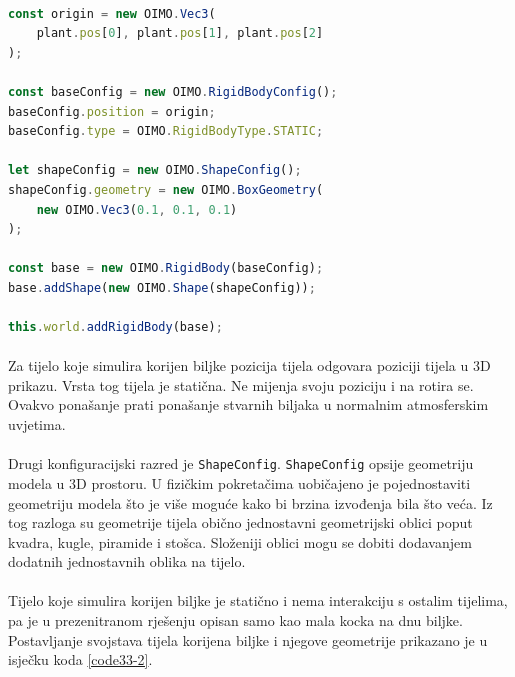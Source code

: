 \documentclass[times, utf8, diplomski]{fer}
\begin{document}
\paragraph{}

\begin{lstlisting}[language=Javascript, caption=Postavljanje tijela korijena biljke i njegovih svojstava,label=code33-2]
const origin = new OIMO.Vec3(
	plant.pos[0], plant.pos[1], plant.pos[2]
);

const baseConfig = new OIMO.RigidBodyConfig();
baseConfig.position = origin;
baseConfig.type = OIMO.RigidBodyType.STATIC;

let shapeConfig = new OIMO.ShapeConfig();
shapeConfig.geometry = new OIMO.BoxGeometry(
	new OIMO.Vec3(0.1, 0.1, 0.1)
);

const base = new OIMO.RigidBody(baseConfig);
base.addShape(new OIMO.Shape(shapeConfig));

this.world.addRigidBody(base);
\end{lstlisting}

\paragraph{}
Za tijelo koje simulira korijen biljke pozicija tijela odgovara poziciji tijela u 3D 
prikazu. Vrsta tog tijela je statična. Ne mijenja svoju poziciju i na rotira se. Ovakvo
ponašanje prati ponašanje stvarnih biljaka u normalnim atmosferskim uvjetima.

\paragraph{}
Drugi konfiguracijski razred je \verb#ShapeConfig#. \verb#ShapeConfig# opsije geometriju 
modela u 3D prostoru. U fizičkim pokretačima uobičajeno je pojednostaviti geometriju modela
što je više moguće kako bi brzina izvođenja bila što veća. Iz tog razloga su geometrije 
tijela obično jednostavni geometrijski oblici poput kvadra, kugle, piramide i stošca.
Složeniji oblici mogu se dobiti dodavanjem dodatnih jednostavnih oblika na tijelo.

\paragraph{}
Tijelo koje simulira korijen biljke je statično i nema interakciju s ostalim tijelima, pa je
u prezenitranom rješenju opisan samo kao mala kocka na dnu biljke. Postavljanje svojstava 
tijela korijena biljke i njegove geometrije prikazano je u isječku koda \ref{code33-2}.
\end{document}
